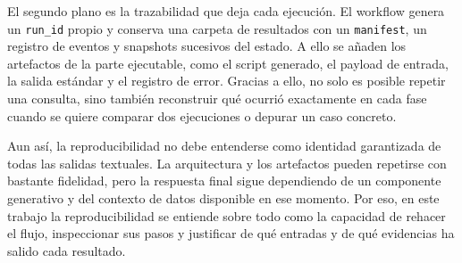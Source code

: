 El segundo plano es la trazabilidad que deja cada ejecuci\'on. El workflow genera un \texttt{run\_id} propio y conserva una carpeta de resultados con un \texttt{manifest},
un registro de eventos y snapshots sucesivos del estado. A ello se a\~naden los artefactos de la parte ejecutable, como el script generado, el payload de entrada, la salida
est\'andar y el registro de error. Gracias a ello, no solo es posible repetir una consulta, sino tambi\'en reconstruir qu\'e ocurri\'o exactamente en cada fase cuando se quiere
comparar dos ejecuciones o depurar un caso concreto.

Aun as\'i, la reproducibilidad no debe entenderse como identidad garantizada de todas las salidas textuales. La arquitectura y los artefactos pueden repetirse con bastante
fidelidad, pero la respuesta final sigue dependiendo de un componente generativo y del contexto de datos disponible en ese momento. Por eso, en este trabajo la reproducibilidad
se entiende sobre todo como la capacidad de rehacer el flujo, inspeccionar sus pasos y justificar de qu\'e entradas y de qu\'e evidencias ha salido cada resultado.

